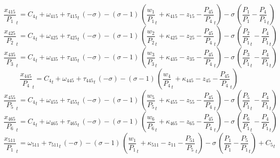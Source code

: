 \begin{dmath}
{{\frac{x_{415}}{P_{1}}}}_{t}={{C_{4}}}_{t}+{{\omega_{415}}}+{{\tau_{415}}}_{t}\, \left(-{{\sigma}}\right)-\left({{\sigma}}-1\right)\, \left({{\frac{w_{1}}{P_{1}}}}_{t}+{{\kappa_{415}}}-{{z_{15}}}-{{\frac{P_{45}}{P_{4}}}}_{t}\right)-{{\sigma}}\, \left({{\frac{P_{1}}{P_{1}}}}-{{\frac{P_{4}}{P_{1}}}}_{t}\right)
\end{dmath}
\begin{dmath}
{{\frac{x_{425}}{P_{2}}}}_{t}={{C_{4}}}_{t}+{{\omega_{425}}}+{{\tau_{425}}}_{t}\, \left(-{{\sigma}}\right)-\left({{\sigma}}-1\right)\, \left({{\frac{w_{2}}{P_{2}}}}_{t}+{{\kappa_{425}}}-{{z_{25}}}-{{\frac{P_{45}}{P_{4}}}}_{t}\right)-{{\sigma}}\, \left({{\frac{P_{2}}{P_{1}}}}_{t}-{{\frac{P_{4}}{P_{1}}}}_{t}\right)
\end{dmath}
\begin{dmath}
{{\frac{x_{435}}{P_{3}}}}_{t}={{C_{4}}}_{t}+{{\omega_{435}}}+{{\tau_{435}}}_{t}\, \left(-{{\sigma}}\right)-\left({{\sigma}}-1\right)\, \left({{\frac{w_{3}}{P_{3}}}}_{t}+{{\kappa_{435}}}-{{z_{35}}}-{{\frac{P_{45}}{P_{4}}}}_{t}\right)-{{\sigma}}\, \left({{\frac{P_{3}}{P_{1}}}}_{t}-{{\frac{P_{4}}{P_{1}}}}_{t}\right)
\end{dmath}
\begin{dmath}
{{\frac{x_{445}}{P_{4}}}}_{t}={{C_{4}}}_{t}+{{\omega_{445}}}+{{\tau_{445}}}_{t}\, \left(-{{\sigma}}\right)-\left({{\sigma}}-1\right)\, \left({{\frac{w_{4}}{P_{4}}}}_{t}+{{\kappa_{445}}}-{{z_{45}}}-{{\frac{P_{45}}{P_{4}}}}_{t}\right)
\end{dmath}
\begin{dmath}
{{\frac{x_{455}}{P_{5}}}}_{t}={{C_{4}}}_{t}+{{\omega_{455}}}+{{\tau_{455}}}_{t}\, \left(-{{\sigma}}\right)-\left({{\sigma}}-1\right)\, \left({{\frac{w_{5}}{P_{5}}}}_{t}+{{\kappa_{455}}}-{{z_{55}}}-{{\frac{P_{45}}{P_{4}}}}_{t}\right)-{{\sigma}}\, \left({{\frac{P_{5}}{P_{1}}}}_{t}-{{\frac{P_{4}}{P_{1}}}}_{t}\right)
\end{dmath}
\begin{dmath}
{{\frac{x_{465}}{P_{6}}}}_{t}={{C_{4}}}_{t}+{{\omega_{465}}}+{{\tau_{465}}}_{t}\, \left(-{{\sigma}}\right)-\left({{\sigma}}-1\right)\, \left({{\frac{w_{6}}{P_{6}}}}_{t}+{{\kappa_{465}}}-{{z_{65}}}-{{\frac{P_{45}}{P_{4}}}}_{t}\right)-{{\sigma}}\, \left({{\frac{P_{6}}{P_{1}}}}_{t}-{{\frac{P_{4}}{P_{1}}}}_{t}\right)
\end{dmath}
\begin{dmath}
{{\frac{x_{511}}{P_{1}}}}_{t}={{\omega_{511}}}+{{\tau_{511}}}_{t}\, \left(-{{\sigma}}\right)-\left({{\sigma}}-1\right)\, \left({{\frac{w_{1}}{P_{1}}}}_{t}+{{\kappa_{511}}}-{{z_{11}}}-{{\frac{P_{51}}{P_{5}}}}_{t}\right)-{{\sigma}}\, \left({{\frac{P_{1}}{P_{1}}}}-{{\frac{P_{5}}{P_{1}}}}_{t}\right)+{{C_{5}}}_{t}
\end{dmath}
